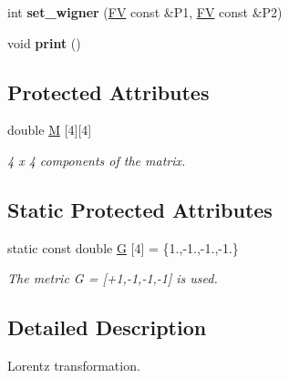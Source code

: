 \begin{DoxyCompactItemize}
\item 
\hypertarget{classLT_a5a8d17a0e9374ba9cef862c1f98a5d62}{int {\bfseries set\-\_\-wigner} (\hyperlink{classFV}{F\-V} const \&P1, \hyperlink{classFV}{F\-V} const \&P2)}\label{classLT_a5a8d17a0e9374ba9cef862c1f98a5d62}

\item 
\hypertarget{classLT_a6687d255d8543565e26ae9bc37b4a414}{void {\bfseries print} ()}\label{classLT_a6687d255d8543565e26ae9bc37b4a414}

\end{DoxyCompactItemize}
\subsection*{Protected Attributes}
\begin{DoxyCompactItemize}
\item 
\hypertarget{classLT_adfe83a60779798fcb358f2fb12d79cda}{double \hyperlink{classLT_adfe83a60779798fcb358f2fb12d79cda}{M} \mbox{[}4\mbox{]}\mbox{[}4\mbox{]}}\label{classLT_adfe83a60779798fcb358f2fb12d79cda}

\begin{DoxyCompactList}\small\item\em 4 x 4 components of the matrix. \end{DoxyCompactList}\end{DoxyCompactItemize}
\subsection*{Static Protected Attributes}
\begin{DoxyCompactItemize}
\item 
\hypertarget{classLT_a3ec591d3e26134d35eb127d0610c7866}{static const double \hyperlink{classLT_a3ec591d3e26134d35eb127d0610c7866}{G} \mbox{[}4\mbox{]} = \{1.,-\/1.,-\/1.,-\/1.\}}\label{classLT_a3ec591d3e26134d35eb127d0610c7866}

\begin{DoxyCompactList}\small\item\em The metric G = \mbox{[}+1,-\/1,-\/1,-\/1\mbox{]} is used. \end{DoxyCompactList}\end{DoxyCompactItemize}


\subsection{Detailed Description}
Lorentz transformation. 

